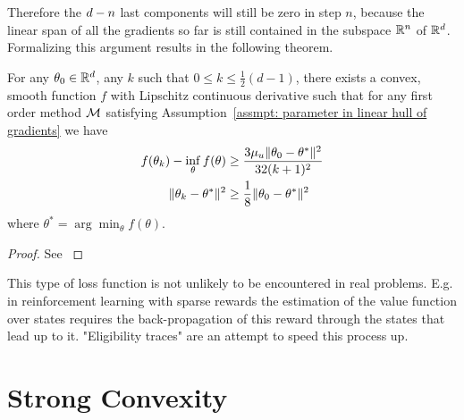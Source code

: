 Therefore the \(d - n\) last components will still be zero in
step \(n\), because the linear span of all the gradients so far is still
contained in the subspace \(\mathbb{R}^n\) of \(\mathbb{R}^d\). Formalizing
this argument results in the following theorem.

\begin{theorem}
	For any \(\theta_0\in\mathbb{R}^d\), any \(k\) such that \(0\le k\le \tfrac12 (d-1)\),
	there exists a convex, smooth function \(f\) with Lipschitz continuous
	derivative such that for any first order method \(\mathcal{M}\)
	satisfying Assumption~\ref{assmpt: parameter in linear hull of gradients}
	we have
	\begin{subequations}
	\begin{align}
		f(\theta_k) - \inf_\theta f(\theta)
		&\ge \frac{3\mu_u \|\theta_0 - \theta^*\|^2}{32(k+1)^2} \\
		\|\theta_k -\theta^*\|^2 
		&\ge \frac18 \|\theta_0 - \theta^*\|^2
	\end{align}
	\end{subequations}
	where \(\theta^* = \arg\min_\theta f(\theta)\).
\end{theorem}
\begin{proof}
	See \textcite[Theorem 2.1.7]{nesterovLecturesConvexOptimization2018}
\end{proof}

\begin{remark}
	This type of loss function is not unlikely to be encountered in real
	problems. E.g. in reinforcement learning with sparse rewards the estimation
	of the value function over states requires the back-propagation of this
	reward through the states that lead up to it. "Eligibility traces"
	\parencite[Chapter 12]{suttonReinforcementLearningIntroduction2018}
	are an attempt to speed this process up.
	\end{remark}

\section{Strong Convexity}\label{sec: Strong Convexity}

